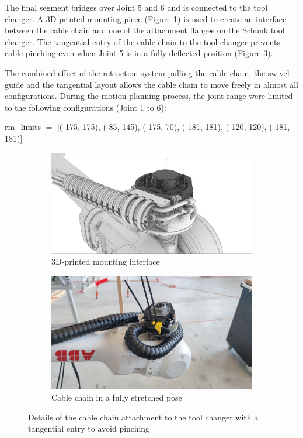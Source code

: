 The final segment bridges over Joint 5 and 6 and is connected to the tool changer. A 3D-printed mounting piece (Figure \ref{fig:3d-printed-mounting-piece}) is used to create an interface between the cable chain and one of the attachment flanges on the Schunk tool changer. The tangential entry of the cable chain to the tool changer prevents cable pinching even when Joint 5 is in a fully deflected position (Figure \ref{fig:cable-chain-in-stretched-pose}).

The combined effect of the retraction system pulling the cable chain, the swivel guide and the tangential layout allows the cable chain to move freely in almost all configurations. During the motion planning process, the joint range were limited to the following configurations (Joint 1 to 6):

{\footnotesize rm\_limits $=$ [(-175, 175), (-85, 145), (-175, 70), (-181, 181), (-120, 120), (-181, 181)]}

\begin{figure}[!h]
    \centering
    \begin{subfigure}[b]{0.49\textwidth}
        \centering
        \includegraphics[width=\textwidth]{images/6a/img07.jpg}
        \caption{3D-printed mounting interface}
        \label{fig:3d-printed-mounting-piece}
    \end{subfigure}
    \begin{subfigure}[b]{0.49\textwidth}
        \centering
        \includegraphics[width=\textwidth]{images/6a/img08.jpg}
        \caption{Cable chain in a fully stretched pose}
        \label{fig:cable-chain-in-stretched-pose}
    \end{subfigure}
    \hfill
    \caption{Details of the cable chain attachment to the tool changer with a tangential entry to avoid pinching}
\end{figure}



